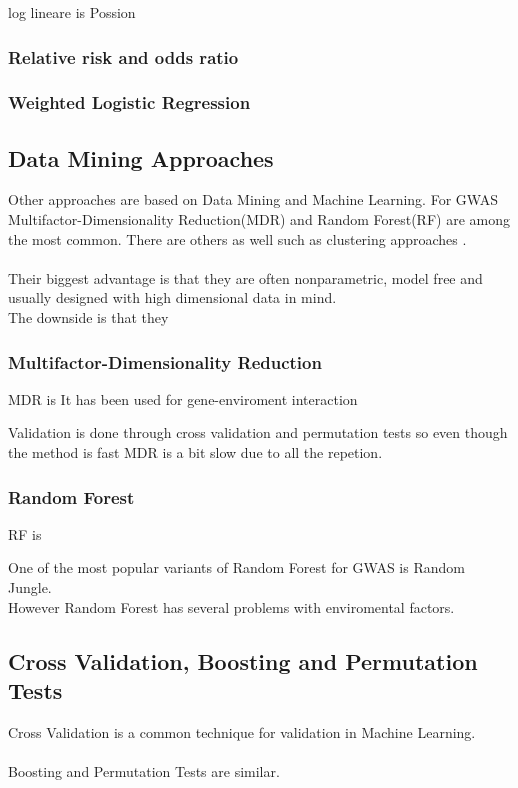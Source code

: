 \documentclass[10pt,a4paper]{article}
\begin{document}
log lineare is Possion

\subsubsection{Relative risk and odds ratio}

\subsubsection{Weighted Logistic Regression}

\subsection{Data Mining Approaches}
Other approaches are based on Data Mining and Machine Learning. For GWAS Multifactor-Dimensionality Reduction(MDR)\cite{mdr_2001} and Random Forest(RF)\cite{random_forest} are among the most common\cite{gene_enviroment_2013}. There are others as well such as clustering approaches \cite{fast_high_order_cluster}.\\
\\
Their biggest advantage is that they are often nonparametric, model free and usually designed with high dimensional data in mind.
\\
The downside is that they

\subsubsection{Multifactor-Dimensionality Reduction}
MDR is \cite{mdr_2001}
It has been used for gene-enviroment interaction\cite{gene_enviroment_2013}

Validation is done through cross validation and permutation tests so even though the method is fast MDR is a bit slow due to all the repetion.

\subsubsection{Random Forest}
RF is \cite{random_forest}

One of the most popular variants of Random Forest for GWAS is Random Jungle.\cite{random_jungle}
\\
However Random Forest has several problems with enviromental factors. \cite{gene_enviroment_2013}

\subsection{Cross Validation, Boosting and Permutation Tests}
Cross Validation is a common technique for validation in Machine Learning.\\
\\
Boosting and Permutation Tests are similar.
\end{document}
